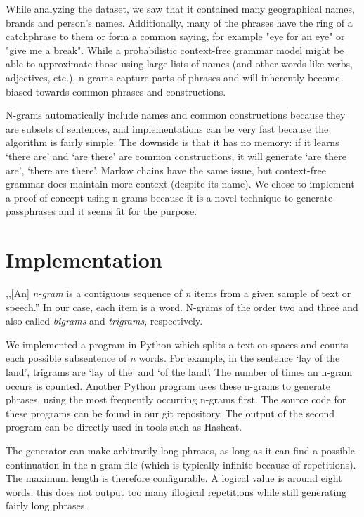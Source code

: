\documentclass{article}
\begin{document}
While analyzing the dataset, we saw that it contained many geographical names,
brands and person's names. Additionally, many of the phrases have the ring of a
catchphrase to them or form a common saying, for example "eye for an eye" or
"give me a break". While a probabilistic context-free grammar model might be
able to approximate those using large lists of names (and other words like
verbs, adjectives, etc.), n-grams capture parts of phrases and will inherently
become biased towards common phrases and constructions.

N-grams automatically include names and common constructions because they are
subsets of sentences, and implementations can be very fast because the
algorithm is fairly simple. The downside is that it has no memory: if it learns
`there are' and `are there' are common constructions, it will generate `are
there are', `there are there'. Markov chains have the same issue, but
context-free grammar does maintain more context (despite its name). We
chose to implement a proof of concept using n-grams because it is a novel
technique to generate passphrases and it seems fit for the purpose.


\section{Implementation}\label{sec:implementation}

,,[An] {\it n-gram} is a contiguous sequence of {\it n} items from a given
sample of text or speech.''\cite{wiki-ngram} In our case, each item is a word.
N-grams of the order two and three and also called {\it bigrams} and {\it
trigrams}, respectively.

We implemented a program in Python which splits a text on spaces and counts
each possible subsentence of {\it n} words. For example, in the sentence `lay
of the land', trigrams are `lay of the' and `of the land'. The number of times
an n-gram occurs is counted. Another Python program uses these n-grams to
generate phrases, using the most frequently occurring n-grams first. The source
code for these programs can be found in our git repository\cite{git}. The
output of the second program can be directly used in tools such as Hashcat.

The generator can make arbitrarily long phrases, as long as it can find a
possible continuation in the n-gram file (which is typically infinite because
of repetitions). The maximum length is therefore configurable. A logical value
is around eight words: this does not output too many illogical repetitions
while still generating fairly long phrases.
\end{document}
